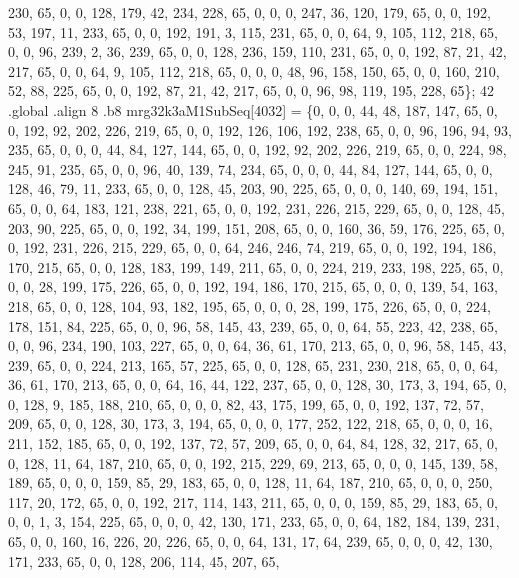 \begin{DoxyCode}
       230, 65, 0, 0, 128, 179, 42, 234, 228, 65, 0, 0, 0, 247, 36, 120, 179, 65, 0, 0, 192, 53, 197, 11, 233, 65, 0,
       0, 192, 191, 3, 115, 231, 65, 0, 0, 64, 9, 105, 112, 218, 65, 0, 0, 96, 239, 2, 36, 239, 65, 0, 0, 128, 236,
       159, 110, 231, 65, 0, 0, 192, 87, 21, 42, 217, 65, 0, 0, 64, 9, 105, 112, 218, 65, 0, 0, 0, 48, 96, 158,
       150, 65, 0, 0, 160, 210, 52, 88, 225, 65, 0, 0, 192, 87, 21, 42, 217, 65, 0, 0, 96, 98, 119, 195, 228, 65\};
42 .global .align 8 .b8 mrg32k3aM1SubSeq[4032] = \{0, 0, 0, 44, 48, 187, 147, 65, 0, 0, 192, 92, 202, 226, 219,
       65, 0, 0, 192, 126, 106, 192, 238, 65, 0, 0, 96, 196, 94, 93, 235, 65, 0, 0, 0, 44, 84, 127, 144, 65, 0, 0,
       192, 92, 202, 226, 219, 65, 0, 0, 224, 98, 245, 91, 235, 65, 0, 0, 96, 40, 139, 74, 234, 65, 0, 0, 0, 44,
       84, 127, 144, 65, 0, 0, 128, 46, 79, 11, 233, 65, 0, 0, 128, 45, 203, 90, 225, 65, 0, 0, 0, 140, 69, 194,
       151, 65, 0, 0, 64, 183, 121, 238, 221, 65, 0, 0, 192, 231, 226, 215, 229, 65, 0, 0, 128, 45, 203, 90, 225, 65,
       0, 0, 192, 34, 199, 151, 208, 65, 0, 0, 160, 36, 59, 176, 225, 65, 0, 0, 192, 231, 226, 215, 229, 65, 0, 0,
       64, 246, 246, 74, 219, 65, 0, 0, 192, 194, 186, 170, 215, 65, 0, 0, 128, 183, 199, 149, 211, 65, 0, 0, 224,
       219, 233, 198, 225, 65, 0, 0, 0, 28, 199, 175, 226, 65, 0, 0, 192, 194, 186, 170, 215, 65, 0, 0, 0, 139, 54,
       163, 218, 65, 0, 0, 128, 104, 93, 182, 195, 65, 0, 0, 0, 28, 199, 175, 226, 65, 0, 0, 224, 178, 151, 84,
       225, 65, 0, 0, 96, 58, 145, 43, 239, 65, 0, 0, 64, 55, 223, 42, 238, 65, 0, 0, 96, 234, 190, 103, 227, 65, 0,
       0, 64, 36, 61, 170, 213, 65, 0, 0, 96, 58, 145, 43, 239, 65, 0, 0, 224, 213, 165, 57, 225, 65, 0, 0, 128,
       65, 231, 230, 218, 65, 0, 0, 64, 36, 61, 170, 213, 65, 0, 0, 64, 16, 44, 122, 237, 65, 0, 0, 128, 30, 173, 3,
       194, 65, 0, 0, 128, 9, 185, 188, 210, 65, 0, 0, 0, 82, 43, 175, 199, 65, 0, 0, 192, 137, 72, 57, 209, 65, 0,
       0, 128, 30, 173, 3, 194, 65, 0, 0, 0, 177, 252, 122, 218, 65, 0, 0, 0, 16, 211, 152, 185, 65, 0, 0, 192,
       137, 72, 57, 209, 65, 0, 0, 64, 84, 128, 32, 217, 65, 0, 0, 128, 11, 64, 187, 210, 65, 0, 0, 192, 215, 229,
       69, 213, 65, 0, 0, 0, 145, 139, 58, 189, 65, 0, 0, 0, 159, 85, 29, 183, 65, 0, 0, 128, 11, 64, 187, 210, 65,
       0, 0, 0, 250, 117, 20, 172, 65, 0, 0, 192, 217, 114, 143, 211, 65, 0, 0, 0, 159, 85, 29, 183, 65, 0, 0, 0, 1,
       3, 154, 225, 65, 0, 0, 0, 42, 130, 171, 233, 65, 0, 0, 64, 182, 184, 139, 231, 65, 0, 0, 160, 16, 226, 20,
       226, 65, 0, 0, 64, 131, 17, 64, 239, 65, 0, 0, 0, 42, 130, 171, 233, 65, 0, 0, 128, 206, 114, 45, 207, 65,

\end{DoxyCode}
